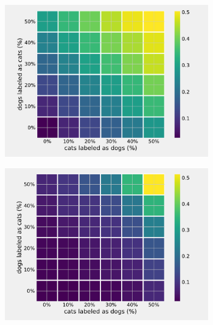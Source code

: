 \documentclass[a4paper,11pt]{scrartcl}
\theoremstyle{definition}
\begin{document}
\begin{figure}%
\centering
\begin{subfigure}[t]{0.32\textwidth}
\includegraphics[width=0.97\textwidth]{Plots_2/3000_otest_images_new.pdf}
\label{subfig:cross_mislabel_observable}
\end{subfigure}
\begin{subfigure}[t]{0.32\textwidth}
\includegraphics[width=0.97\textwidth]{Plots_2/3000_ttest_images_new.pdf}
\label{subfig:cross_mislabel_true}
\end{subfigure}
\begin{subfigure}[t]{0.32\textwidth}

\end{subfigure}
\end{figure}
\end{document}
